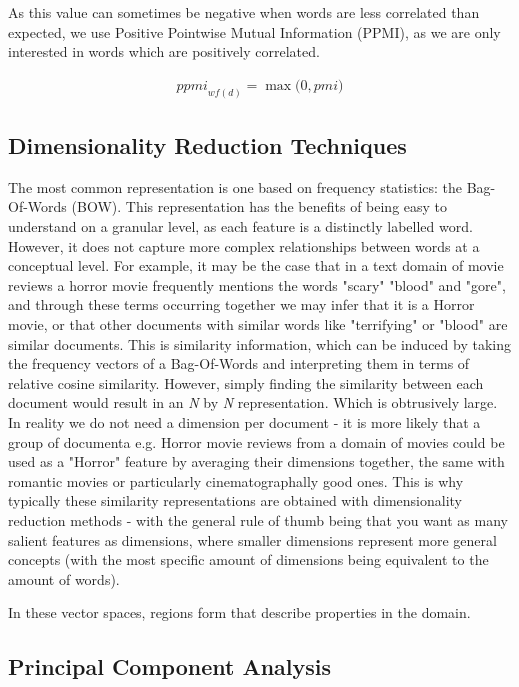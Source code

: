 As this value can sometimes be negative when words are less correlated than expected, we use Positive Pointwise Mutual Information (PPMI), as we are only interested in words which are positively correlated.

\begin{align*}
\textit{ppmi}_{{wf}(d)} = \max \big(0, pmi)
\end{align*}


\subsection{Dimensionality Reduction Techniques}\label{ch2:vectorspaces}

The most common representation is one based on frequency statistics: the Bag-Of-Words (BOW). This representation has the benefits of being easy to understand on a granular level, as each feature is a distinctly labelled word. However, it does not capture more complex relationships between words at a conceptual level. For example, it may be the case that in a text domain of movie reviews a horror movie frequently mentions the words "scary" "blood" and "gore", and through these terms occurring together we may infer that it is a Horror movie, or that other documents with similar words like "terrifying" or "blood" are similar documents. This is similarity information, which can be induced by taking the frequency vectors of a Bag-Of-Words and interpreting them in terms of relative cosine similarity. However, simply finding the similarity between each document would result in an \textit {N} by \textit {N} representation. Which is obtrusively large. In reality we do not need a dimension per document - it is more likely that a group of documenta e.g. Horror movie reviews from a domain of movies could be used as a "Horror" feature by averaging their dimensions together, the same with romantic movies or particularly cinematographally good ones. This is why typically these similarity representations are obtained with dimensionality reduction methods - with the general rule of thumb being that you want as many salient features as dimensions, where smaller dimensions represent more general concepts (with the most specific amount of dimensions being equivalent to the amount of words). 



In these vector spaces, regions form that describe properties in the domain. 



\subsection{Principal Component Analysis}


